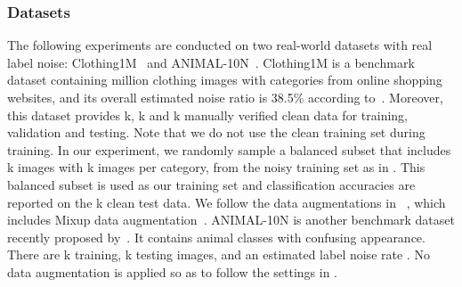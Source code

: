 \documentclass[journal]{IEEEtran}
\begin{document}
\subsubsection{Datasets}
The following experiments are conducted on two real-world datasets with real label noise: Clothing1M~\cite{xiao2015learning} and ANIMAL-10N~\cite{song2019selfie}. 
Clothing1M is a benchmark dataset containing  million clothing images with  categories from online shopping websites, and its overall estimated noise ratio is 38.5\% according to~\cite{xiao2015learning}.
Moreover, this dataset provides k, k and k manually verified clean data for training, validation and testing. 
Note that we do not use the clean training set during training.
In our experiment, we randomly sample a balanced subset that includes k images with k images per category, from the noisy training set as in \cite{yi2019probabilistic,zhang2021learning}.
This balanced subset is used as our training set and classification accuracies are reported on the k clean test data. 
We follow the data augmentations in ~\cite{li2020dividemix,liu2020early,arazo2019unsupervised}, which includes Mixup data augmentation~\cite{zhang2018mixup}.
ANIMAL-10N is another benchmark dataset recently proposed by~\cite{song2019selfie}. 
It contains  animal classes with confusing appearance.
There are k training, k testing images, and an estimated label noise rate . 
No data augmentation is applied so as to follow the settings in \cite{song2019selfie}.
\end{document}
